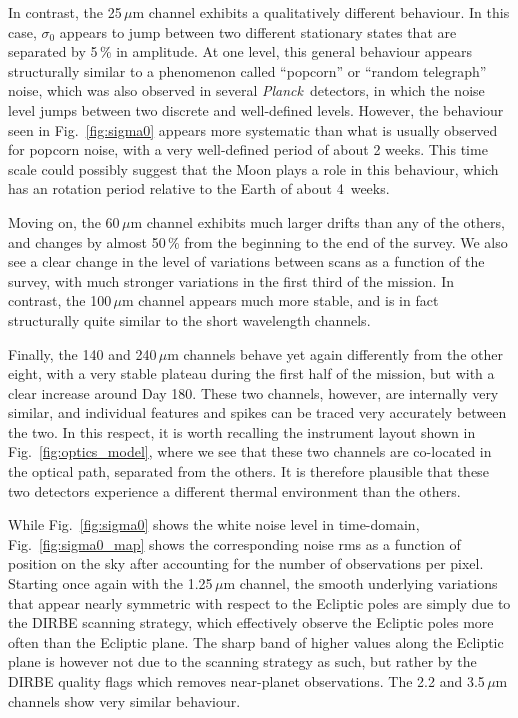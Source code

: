 \documentclass{aa}
\def\Planck{\textit{Planck}}
\begin{document}
       
In contrast, the 25$\,\mu$m channel exhibits a qualitatively different
behaviour. In this case, $\sigma_0$ appears to jump between two
different stationary states that are separated by 5\,\% in
amplitude. At one level, this general behaviour appears structurally
similar to a phenomenon called ``popcorn'' or ``random telegraph''
noise, which was also observed in several \Planck\ detectors, in which
the noise level jumps between two discrete and well-defined
levels. However, the behaviour seen in Fig.~\ref{fig:sigma0} appears
more systematic than what is usually observed for popcorn noise, with
a very well-defined period of about 2 weeks. This time scale could
possibly suggest that the Moon plays a role in this behaviour, which
has an rotation period relative to the Earth of about 4~weeks.

Moving on, the 60$\,\mu$m channel exhibits much larger drifts than any
of the others, and changes by almost 50\,\% from the beginning to the
end of the survey. We also see a clear change in the level of
variations between scans as a function of the survey, with much
stronger variations in the first third of the mission. In contrast,
the 100\,$\mu$m channel appears much more stable, and is in fact
structurally quite similar to the short wavelength channels.

Finally, the 140 and 240$\,\mu$m channels behave yet again differently
from the other eight, with a very stable plateau during the first half
of the mission, but with a clear increase around Day 180. These two
channels, however, are internally very similar, and individual
features and spikes can be traced very accurately between the two. In
this respect, it is worth recalling the instrument layout shown in
Fig.~\ref{fig:optics_model}, where we see that these two channels are
co-located in the optical path, separated from the others. It is
therefore plausible that these two detectors experience a different
thermal environment than the others.

While Fig.~\ref{fig:sigma0} shows the white noise level in
time-domain, Fig.~\ref{fig:sigma0_map} shows the corresponding noise
rms as a function of position on the sky after accounting for the
number of observations per pixel. Starting once again with the
1.25$\,\mu$m channel, the smooth underlying variations that appear
nearly symmetric with respect to the Ecliptic poles are simply due to
the DIRBE scanning strategy, which effectively observe the Ecliptic
poles more often than the Ecliptic plane. The sharp band of higher
values along the Ecliptic plane is however not due to the scanning
strategy as such, but rather by the DIRBE quality flags which removes
near-planet observations. The 2.2 and 3.5$\,\mu$m channels show very
similar behaviour.
\end{document}
